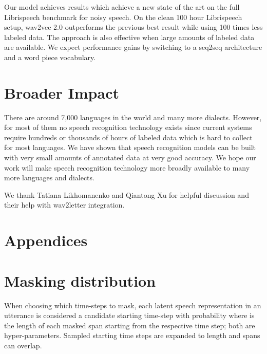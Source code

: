 \documentclass{article}
\newcommand{\libri}{Librispeech}
\begin{document}
Our model achieves results which achieve a new state of the art on the full Librispeech benchmark for noisy speech.
On the clean 100 hour \libri{} setup, wav2vec 2.0 outperforms the previous best result while using 100 times less labeled data.
The approach is also effective when large amounts of labeled data are available. 
We expect performance gains by switching to a seq2seq architecture and a word piece vocabulary.



\section*{Broader Impact}

There are around 7,000 languages in the world and many more dialects. 
However, for most of them no speech recognition technology exists since current systems require hundreds or thousands of hours of labeled data which is hard to collect for most languages.
We have shown that speech recognition models can be built with very small amounts of annotated data at very good accuracy.
We hope our work will make speech recognition technology more broadly available to many more languages and dialects.

\begin{ack}
We thank Tatiana Likhomanenko and Qiantong Xu for helpful discussion and their help with wav2letter integration.

\end{ack}









\newpage

\appendix
\renewcommand{\thesection}{\Alph{section}}


\section*{Appendices}

\section{Masking distribution}
\label{app:masking}

When choosing which time-steps to mask, each latent speech representation in an utterance is considered a candidate starting time-step with probability  where  is the length of each masked span starting from the respective time step; both are hyper-parameters.
Sampled starting time steps are expanded to length  and spans can overlap.
\end{document}

